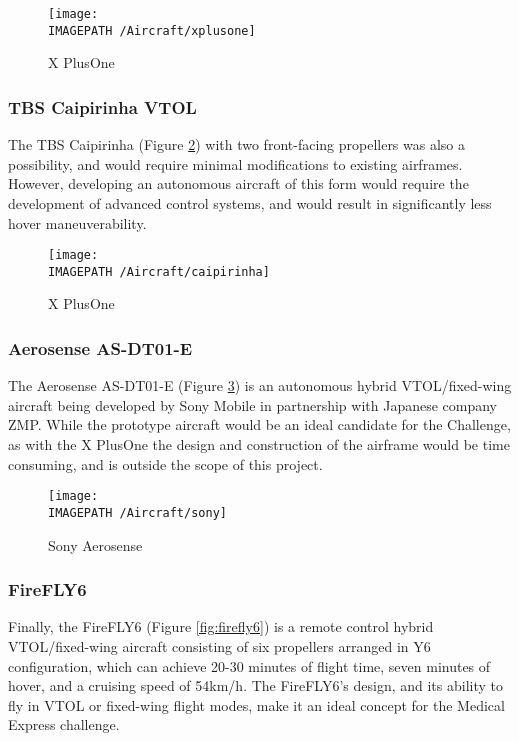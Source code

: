 \begin{figure}[!h]
	\centering
	\texttt{[image: \\IMAGEPATH /Aircraft/xplusone]}
	\caption{X PlusOne}
	\label{fig:xplusone}
\end{figure}

\subsubsection*{TBS Caipirinha VTOL}
The TBS Caipirinha \cite{ref:caipirinha} (Figure \ref{fig:caipirinha}) with two front-facing propellers was also a possibility, and would require minimal modifications to existing airframes. However, developing an autonomous aircraft of this form would require the development of advanced control systems, and would result in significantly less hover maneuverability.

\begin{figure}[!h]
	\centering
	\texttt{[image: \\IMAGEPATH /Aircraft/caipirinha]}
	\caption{X PlusOne}
	\label{fig:caipirinha}
\end{figure}

\subsubsection*{Aerosense AS-DT01-E}
The Aerosense AS-DT01-E \cite{ref:sony} (Figure \ref{fig:sony}) is an autonomous hybrid VTOL/fixed-wing aircraft being developed by Sony Mobile in partnership with Japanese company ZMP. While the prototype aircraft would be an ideal candidate for the Challenge, as with the X PlusOne the design and construction of the airframe would be time consuming, and is outside the scope of this project.

\begin{figure}[!h]
	\centering
	\texttt{[image: \\IMAGEPATH /Aircraft/sony]}
	\caption{Sony Aerosense}
	\label{fig:sony}
\end{figure}

\subsubsection*{FireFLY6}
Finally, the FireFLY6 \cite{ref:firefly6} (Figure \ref{fig:firefly6}) is a remote control hybrid VTOL/fixed-wing aircraft consisting of six propellers arranged in Y6 configuration, which can achieve 20-30 minutes of flight time, seven minutes of hover, and a cruising speed of 54km/h. The FireFLY6's design, and its ability to fly in VTOL or fixed-wing flight modes, make it an ideal concept for the Medical Express challenge.\\

